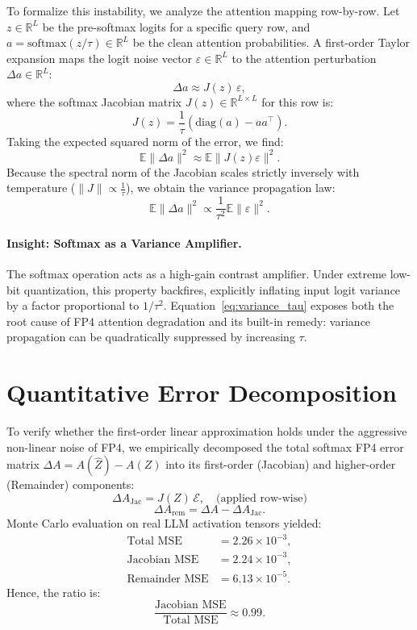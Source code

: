 To formalize this instability, we analyze the attention mapping row-by-row. Let $z \in \mathbb{R}^L$ be the pre-softmax logits for a specific query row, and $a = \mathrm{softmax}(z/\tau) \in \mathbb{R}^L$ be the clean attention probabilities. A first-order Taylor expansion maps the logit noise vector $\varepsilon \in \mathbb{R}^L$ to the attention perturbation $\Delta a \in \mathbb{R}^L$:
\[
\Delta a
\approx
J(z)\,\varepsilon,
\]
where the softmax Jacobian matrix $J(z) \in \mathbb{R}^{L \times L}$ for this row is:
\begin{equation}
J(z)
=
\frac{1}{\tau}
\left(
\mathrm{diag}(a) - aa^\top
\right).
\label{eq:jacobian}
\end{equation}
Taking the expected squared norm of the error, we find:
\[
\mathbb{E}\|\Delta a\|^2
\approx
\mathbb{E}\|J(z) \varepsilon\|^2.
\]
Because the spectral norm of the Jacobian scales strictly inversely with temperature ($\|J\| \propto \frac{1}{\tau}$), we obtain the variance propagation law:
\begin{equation}
\mathbb{E}\|\Delta a\|^2
\propto
\frac{1}{\tau^2}
\mathbb{E}\|\varepsilon\|^2.
\label{eq:variance_tau}
\end{equation}

\paragraph{Insight: Softmax as a Variance Amplifier.}
The softmax operation acts as a high-gain contrast amplifier. Under extreme low-bit quantization, this property backfires, explicitly inflating input logit variance by a factor proportional to $1/\tau^2$. Equation~\eqref{eq:variance_tau} exposes both the root cause of FP4 attention degradation and its built-in remedy: variance propagation can be quadratically suppressed by increasing $\tau$.

\section{Quantitative Error Decomposition}

To verify whether the first-order linear approximation holds under the aggressive non-linear noise of FP4, we empirically decomposed the total softmax FP4 error matrix $\Delta A = A(\widehat{Z}) - A(Z)$ into its first-order (Jacobian) and higher-order (Remainder) components:
\[
\Delta A_{\mathrm{Jac}} = J(Z)\,\mathcal{E}, \quad \text{(applied row-wise)}
\]
\[
\Delta A_{\mathrm{rem}} = \Delta A - \Delta A_{\mathrm{Jac}}.
\]
Monte Carlo evaluation on real LLM activation tensors yielded:
\begin{align*}
\text{Total MSE} &= 2.26 \times 10^{-3}, \\
\text{Jacobian MSE} &= 2.24 \times 10^{-3}, \\
\text{Remainder MSE} &= 6.13 \times 10^{-5}.
\end{align*}
Hence, the ratio is:
\[
\frac{\text{Jacobian MSE}}{\text{Total MSE}} \approx 0.99.
\]

